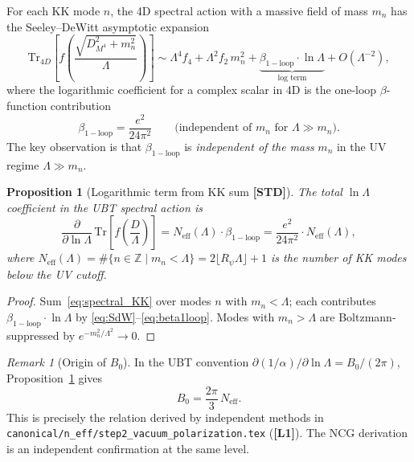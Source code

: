 \documentclass[12pt,a4paper]{article}
\newtheorem{proposition}[theorem]{Proposition}
\theoremstyle{remark}
\newtheorem{remark}[theorem]{Remark}
\newcommand{\STD}{\textbf{[STD]}}
\begin{document}
For each KK mode $n$, the 4D spectral action with a massive field of
mass $m_n$ has the Seeley--DeWitt asymptotic expansion
\begin{equation}
  \mathrm{Tr}_{4D}\!\left[f\!\left(\frac{\sqrt{D_{M^4}^2+m_n^2}}{\Lambda}\right)\right]
  \sim \Lambda^4 f_4 + \Lambda^2 f_2\,m_n^2
    + \underbrace{\beta_{\mathrm{1-loop}}\cdot\ln\Lambda}_{\text{log term}}
    + O(\Lambda^{-2}),
  \label{eq:SdW}
\end{equation}
where the logarithmic coefficient for a complex scalar in 4D is the
one-loop $\beta$-function contribution
\begin{equation}
  \beta_{\mathrm{1-loop}} = \frac{e^2}{24\pi^2}
  \qquad \text{(independent of }m_n\text{ for }\Lambda\gg m_n).
  \label{eq:beta1loop}
\end{equation}
The key observation is that $\beta_{\mathrm{1-loop}}$ is \emph{independent
of the mass} $m_n$ in the UV regime $\Lambda\gg m_n$.

\begin{proposition}[Logarithmic term from KK sum \STD]
\label{prop:log}
The total $\ln\Lambda$ coefficient in the UBT spectral action is
\begin{equation}
  \boxed{
  \frac{\partial}{\partial\ln\Lambda}\,
  \mathrm{Tr}\!\left[f\!\left(\frac{D}{\Lambda}\right)\right]
  = N_{\mathrm{eff}}(\Lambda)\cdot\beta_{\mathrm{1-loop}}
  = \frac{e^2}{24\pi^2}\cdot N_{\mathrm{eff}}(\Lambda),}
  \label{eq:logcoeff}
\end{equation}
where $N_{\mathrm{eff}}(\Lambda) = \#\{n\in\mathbb{Z}\mid m_n < \Lambda\}
= 2\lfloor R_\psi\Lambda\rfloor + 1$ is the number of KK modes below the
UV cutoff.
\end{proposition}

\begin{proof}
Sum~\eqref{eq:spectral_KK} over modes $n$ with $m_n<\Lambda$; each
contributes $\beta_{\mathrm{1-loop}}\cdot\ln\Lambda$ by \eqref{eq:SdW}--\eqref{eq:beta1loop}.
Modes with $m_n>\Lambda$ are Boltzmann-suppressed by $e^{-m_n^2/\Lambda^2}\to 0$.
\end{proof}

\begin{remark}[Origin of $B_0$]
In the UBT convention $\partial(1/\alpha)/\partial\ln\Lambda = B_0/(2\pi)$,
Proposition~\ref{prop:log} gives
\begin{equation}
  B_0 = \frac{2\pi}{3}\,N_{\mathrm{eff}}.
  \label{eq:B0NCG}
\end{equation}
This is precisely the relation derived by independent methods in
\texttt{canonical/n\_eff/step2\_vacuum\_polarization.tex} (\textbf{[L1]}).
The NCG derivation is an independent confirmation at the same level.
\end{remark}
\end{document}
